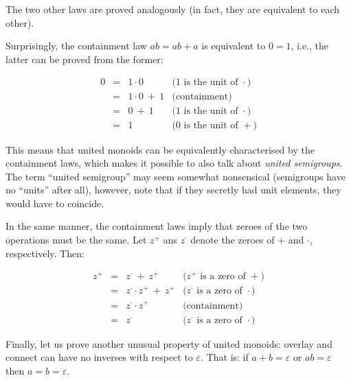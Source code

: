 \documentclass[english,submission]{programming}
\begin{document}
\noindent
The two other laws are proved analogously (in fact, they are equivalent to each
other).

Surprisingly, the containment law $\textit{ab} = \textit{ab} + a$ is equivalent
to $0 = 1$, i.e., the latter can be proved from the former:

\vspace{-5mm}
\begin{equation*}
\begin{array}{rcll}
0 & = & 1\cdot0 & \text{($1$ is the unit of $\cdot$)}\\
 & = & 1\cdot0\ +\ 1 & \text{(containment)}\\
 & = & 0\ +\ 1 & \text{($1$ is the unit of $\cdot$)}\\
 & = & 1 & \text{($0$ is the unit of $+$)}
\end{array}
\end{equation*}
\vspace{-3mm}

\noindent
This means that united monoids can be equivalently characterised by the
containment laws, which makes it possible to also talk about
\emph{united semigroups}. The term ``united semigroup'' may seem somewhat
nonsensical (semigroups have no ``units'' after all), however, note that if they
secretly had unit elements, they would have to coincide.

In the same manner, the containment laws imply that zeroes of the two operations
must be the same. Let $z^{+}$ ans $z^{\cdot}$ denote the zeroes of $+$ and
$\cdot$, respectively. Then:

\vspace{-5mm}
\begin{equation*}
\begin{array}{rcll}
z^{+} & = & z^{\cdot}\ +\ z^{+} & \text{($z^{+}$ is a zero of $+$)}\\
 & = & z^{\cdot} \cdot z^{+}\ +\ z^{+} & \text{($z^{\cdot}$ is a zero of $\cdot$)}\\
 & = & z^{\cdot} \cdot z^{+} & \text{(containment)}\\
 & = & z^{\cdot} & \text{($z^{\cdot}$ is a zero of $\cdot$)}
\end{array}
\end{equation*}
\vspace{-3mm}

\noindent
Finally, let us prove another unusual property of united monoids: overlay and
connect can have no inverses with respect to $\varepsilon$. That is: if
$a + b = \varepsilon$ or $\textit{ab} = \varepsilon$ then $a = b = \varepsilon$.
\end{document}
